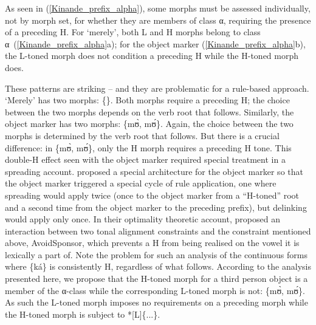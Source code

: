 As seen in (\ref{Kinande_prefix_alpha}), some morphs must be assessed individually, not by morph set, for whether they are members of class α, requiring the presence of a preceding H. For `merely', both L and H morphs belong to class α\ (\ref{Kinande_prefix_alpha}a); for the object marker (\ref{Kinande_prefix_alpha}b), the L-toned morph does not condition a preceding H while the H-toned morph does.

These patterns are striking -- and they are problematic for a rule-based approach. `Merely' has two morphs: \{\}. Both morphs require a preceding H; the choice between the two morphs depends on the verb root that follows. Similarly, the object marker has two morphs: \{m\`{ʊ}, m\'{ʊ}\}. Again, the choice between the two morphs is determined by the verb root that follows. But there is a crucial difference: in \{m\`{ʊ}, m\'{ʊ}\}, only  the H morph  requires a preceding H tone. This double-H effect seen with the object marker required special treatment in a spreading account.  \citet{Mutaka:1994} proposed a special architecture for the object marker so that the object marker triggered a special cycle of rule application, one where spreading would apply twice (once to the object marker from a ``H-toned'' root and a second time from the object marker to the preceding prefix), but delinking would apply only once. In their optimality theoretic account, \citet{Akinlabi+:2001} proposed an interaction between two tonal alignment constraints and the constraint mentioned above, {\sc AvoidSponsor}, which prevents a H from being realised on the vowel it is lexically a part of. Note the problem for such an analysis of the continuous forms where \{ká\} is consistently H, regardless of what follows. According to the analysis presented here, we propose that the H-toned morph for a third person object is a member of the α-class while the corresponding L-toned morph is not: \{m\`{ʊ}, m\'{ʊ}\}. As such the L-toned morph imposes no requirements on a preceding morph while the H-toned morph is subject to *[L]\{...\}.

